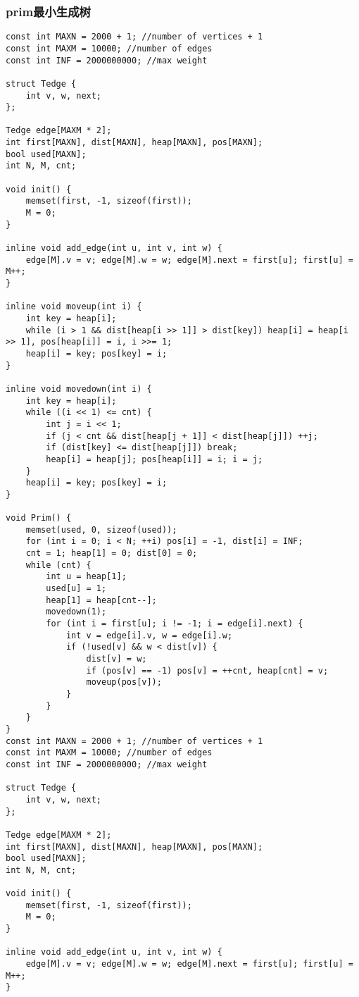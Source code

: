 \subsubsection{prim最小生成树}
\begin{verbatim}
const int MAXN = 2000 + 1; //number of vertices + 1
const int MAXM = 10000; //number of edges
const int INF = 2000000000; //max weight

struct Tedge {
    int v, w, next;
};

Tedge edge[MAXM * 2];
int first[MAXN], dist[MAXN], heap[MAXN], pos[MAXN];
bool used[MAXN];
int N, M, cnt;

void init() {
    memset(first, -1, sizeof(first));
    M = 0;
}

inline void add_edge(int u, int v, int w) {
    edge[M].v = v; edge[M].w = w; edge[M].next = first[u]; first[u] = M++;
}

inline void moveup(int i) {
    int key = heap[i];
    while (i > 1 && dist[heap[i >> 1]] > dist[key]) heap[i] = heap[i >> 1], pos[heap[i]] = i, i >>= 1;
    heap[i] = key; pos[key] = i;
}

inline void movedown(int i) {
    int key = heap[i];
    while ((i << 1) <= cnt) {
        int j = i << 1;
        if (j < cnt && dist[heap[j + 1]] < dist[heap[j]]) ++j;
        if (dist[key] <= dist[heap[j]]) break;
        heap[i] = heap[j]; pos[heap[i]] = i; i = j;
    }
    heap[i] = key; pos[key] = i;
}

void Prim() {
    memset(used, 0, sizeof(used));
    for (int i = 0; i < N; ++i) pos[i] = -1, dist[i] = INF;
    cnt = 1; heap[1] = 0; dist[0] = 0;
    while (cnt) {
        int u = heap[1];
        used[u] = 1;
        heap[1] = heap[cnt--];
        movedown(1);
        for (int i = first[u]; i != -1; i = edge[i].next) {
            int v = edge[i].v, w = edge[i].w;
            if (!used[v] && w < dist[v]) {
                dist[v] = w;
                if (pos[v] == -1) pos[v] = ++cnt, heap[cnt] = v;
                moveup(pos[v]);
            }
        }
    }
}
const int MAXN = 2000 + 1; //number of vertices + 1
const int MAXM = 10000; //number of edges
const int INF = 2000000000; //max weight

struct Tedge {
    int v, w, next;
};

Tedge edge[MAXM * 2];
int first[MAXN], dist[MAXN], heap[MAXN], pos[MAXN];
bool used[MAXN];
int N, M, cnt;

void init() {
    memset(first, -1, sizeof(first));
    M = 0;
}

inline void add_edge(int u, int v, int w) {
    edge[M].v = v; edge[M].w = w; edge[M].next = first[u]; first[u] = M++;
}


\end{verbatim}
